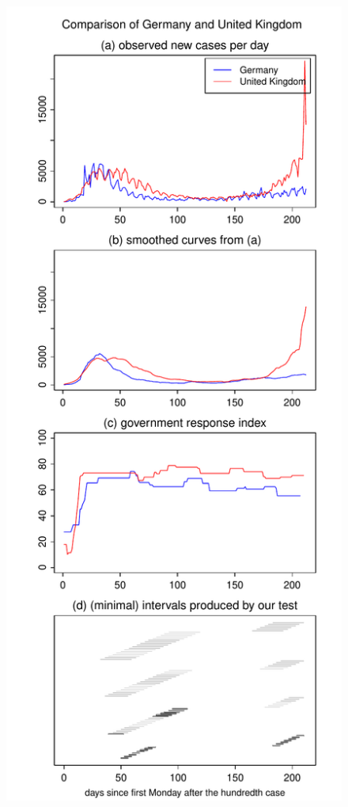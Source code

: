\documentclass[a4paper,12pt]{article}
\numberwithin{equation}{section}
\begin{document}
\begin{figure}[h!]
\begin{minipage}[t]{0.49\textwidth}
\includegraphics[width=\textwidth]{plots/DEU_vs_GBR_four_countries}

\end{minipage}
\end{figure}
\end{document}
